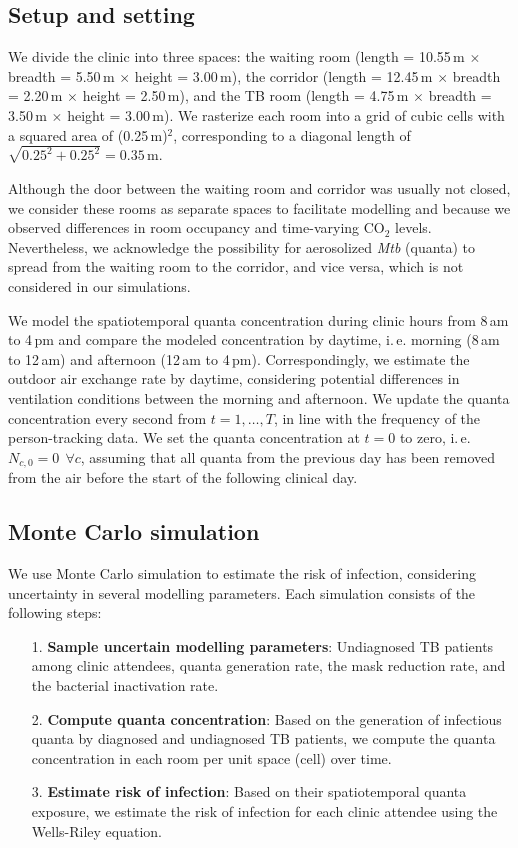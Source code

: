 \documentclass[fleqn,11pt]{wlscirep_supp}
\newcommand\ie{i.\,e.\xspace}
\begin{document}
\subsection{Setup and setting}\label{prep:building}

We divide the clinic into three spaces: the waiting room (length = 10.55\,m $\times$ breadth = 5.50\,m $\times$ height = 3.00\,m), the corridor (length = 12.45\,m $\times$ breadth = 2.20\,m $\times$ height = 2.50\,m), and the TB room (length = 4.75\,m $\times$ breadth = 3.50\,m $\times$ height = 3.00\,m). We rasterize each room into a grid of cubic cells with a squared area of (0.25\,m)$^2$, corresponding to a diagonal length of $\sqrt{0.25^2 + 0.25^2} = 0.35$\,m. 

Although the door between the waiting room and corridor was usually not closed, we consider these rooms as separate spaces to facilitate modelling and because we observed differences in room occupancy and time-varying CO$_2$ levels. Nevertheless, we acknowledge the possibility for aerosolized \emph{Mtb} (quanta) to spread from the waiting room to the corridor, and vice versa, which is not considered in our simulations.  

We model the spatiotemporal quanta concentration during clinic hours from 8\,am to 4\,pm and compare the modeled concentration by daytime, \ie morning (8\,am to 12\,am) and afternoon (12\,am to 4\,pm). Correspondingly, we estimate the outdoor air exchange rate by daytime, considering potential differences in ventilation conditions between the morning and afternoon. We update the quanta concentration every second from $t = 1, \dots, T$, in line with the frequency of the person-tracking data. We set the quanta concentration at $t=0$ to zero, \ie $N_{c,0} = 0 ~~ \forall c$, assuming that all quanta from the previous day has been removed from the air before the start of the following clinical day. 


\subsection{Monte Carlo simulation}

We use Monte Carlo simulation to estimate the risk of infection, considering uncertainty in several modelling parameters. Each simulation consists of the following steps:
\begin{itemize}
    \item[1.] \textbf{Sample uncertain modelling parameters}: Undiagnosed TB patients among clinic attendees, quanta generation rate, the mask reduction rate, and the bacterial inactivation rate.
    \item[2.] \textbf{Compute quanta concentration}: Based on the generation of infectious quanta by diagnosed and undiagnosed TB patients, we compute the quanta concentration in each room per unit space (cell) over time.
    \item[3.] \textbf{Estimate risk of infection}: Based on their spatiotemporal quanta exposure, we estimate the risk of infection for each clinic attendee using the Wells-Riley equation.
\end{itemize}
\end{document}
